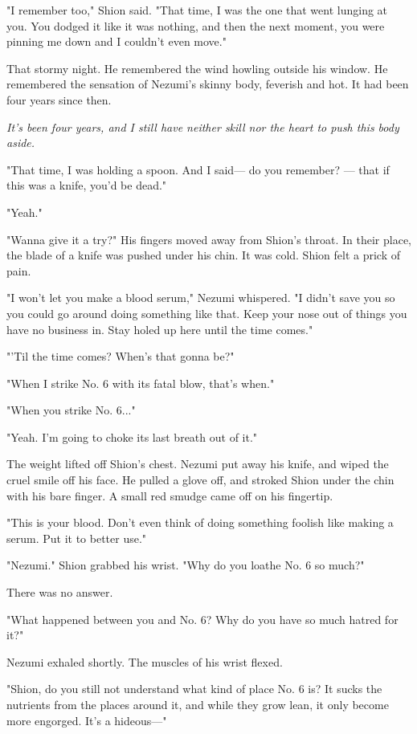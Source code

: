 "I remember too," Shion said. "That time, I was the one that went
lunging at you. You dodged it like it was nothing, and then the next
moment, you were pinning me down and I couldn't even move."

That stormy night. He remembered the wind howling outside his window. He
remembered the sensation of Nezumi's skinny body, feverish and hot. It
had been four years since then.

\emph{It's been four years, and I still have neither skill nor the heart to
push this body aside.}

"That time, I was holding a spoon. And I said--- do you remember? --- that
if this was a knife, you'd be dead."

"Yeah."

"Wanna give it a try?" His fingers moved away from Shion's throat. In
their place, the blade of a knife was pushed under his chin. It was
cold. Shion felt a prick of pain.

"I won't let you make a blood serum," Nezumi whispered. "I didn't save
you so you could go around doing something like that. Keep your nose out
of things you have no business in. Stay holed up here until the time
comes."

"'Til the time comes? When's that gonna be?"

"When I strike No. 6 with its fatal blow, that's when."

"When you strike No. 6..."

"Yeah. I'm going to choke its last breath out of it."

The weight lifted off Shion's chest. Nezumi put away his knife, and
wiped the cruel smile off his face. He pulled a glove off, and stroked
Shion under the chin with his bare finger. A small red smudge came off
on his fingertip.

"This is your blood. Don't even think of doing something foolish like
making a serum. Put it to better use."

"Nezumi." Shion grabbed his wrist. "Why do you loathe No. 6 so much?"

There was no answer.

"What happened between you and No. 6? Why do you have so much hatred for
it?"

Nezumi exhaled shortly. The muscles of his wrist flexed.

"Shion, do you still not understand what kind of place No. 6 is? It
sucks the nutrients from the places around it, and while they grow lean,
it only become more engorged. It's a hideous---"

